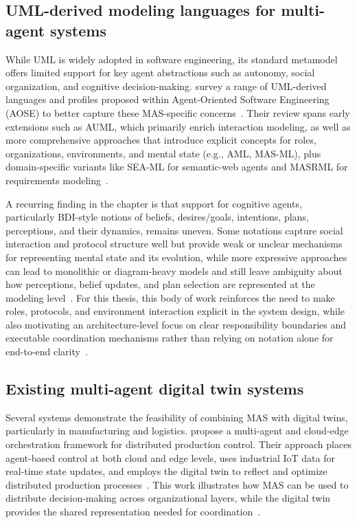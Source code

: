 \subsection{UML-derived modeling languages for multi-agent systems}
While UML is widely adopted in software engineering, its standard metamodel offers limited support for key agent abstractions such as autonomy, social organization, and cognitive decision-making. \citeauthor{GuedesVicari2022UMLDerived} survey a range of UML-derived languages and profiles proposed within Agent-Oriented Software Engineering (AOSE) to better capture these MAS-specific concerns~\cite{GuedesVicari2022UMLDerived}. Their review spans early extensions such as AUML, which primarily enrich interaction modeling, as well as more comprehensive approaches that introduce explicit concepts for roles, organizations, environments, and mental state (e.g., AML, MAS-ML), plus domain-specific variants like SEA-ML for semantic-web agents and MASRML for requirements modeling~\cite{GuedesVicari2022UMLDerived}.

A recurring finding in the chapter is that support for cognitive agents, particularly BDI-style notions of beliefs, desires/goals, intentions, plans, perceptions, and their dynamics, remains uneven. Some notations capture social interaction and protocol structure well but provide weak or unclear mechanisms for representing mental state and its evolution, while more expressive approaches can lead to monolithic or diagram-heavy models and still leave ambiguity about how perceptions, belief updates, and plan selection are represented at the modeling level~\cite{GuedesVicari2022UMLDerived}. For this thesis, this body of work reinforces the need to make roles, protocols, and environment interaction explicit in the system design, while also motivating an architecture-level focus on clear responsibility boundaries and executable coordination mechanisms rather than relying on notation alone for end-to-end clarity~\cite{GuedesVicari2022UMLDerived}.


\subsection{Existing multi-agent digital twin systems}
Several systems demonstrate the feasibility of combining MAS with digital twins, particularly in manufacturing and logistics. \citeauthor{nie2023_cloud_edge_dt_mas} propose a multi-agent and cloud-edge orchestration framework for distributed production control. Their approach places agent-based control at both cloud and edge levels, uses industrial IoT data for real-time state updates, and employs the digital twin to reflect and optimize distributed production processes~\cite{nie2023_cloud_edge_dt_mas}.
This work illustrates how MAS can be used to distribute decision-making across organizational layers, while the digital twin provides the shared representation needed for coordination~\cite{nie2023_cloud_edge_dt_mas}.

